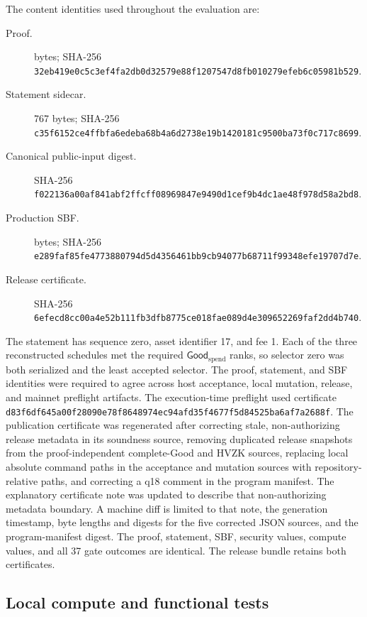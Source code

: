 The content identities used throughout the evaluation are:
\begin{description}
  \item[Proof.] \ProfileProofBytes{} bytes; SHA-256
  \nolinkurl{32eb419e0c5c3ef4fa2db0d32579e88f1207547d8fb010279efeb6c05981b529}.
  \item[Statement sidecar.] 767 bytes; SHA-256
  \nolinkurl{c35f6152ce4ffbfa6edeba68b4a6d2738e19b1420181c9500ba73f0c717c8699}.
  \item[Canonical public-input digest.] SHA-256
  \nolinkurl{f022136a00af841abf2ffcff08969847e9490d1cef9b4dc1ae48f978d58a2bd8}.
  \item[Production SBF.] \ProfileSbfBytes{} bytes; SHA-256
  \nolinkurl{e289faf85fe4773880794d5d4356461bb9cb94077b68711f99348efe19707d7e}.
  \item[Release certificate.] SHA-256
  \nolinkurl{6efecd8cc00a4e52b111fb3dfb8775ce018fae089d4e309652269faf2dd4b740}.
\end{description}

The statement has sequence zero, asset identifier 17, and fee 1.  Each of the
three reconstructed schedules met the required $\mathsf{Good}_{\mathrm{spend}}$ ranks,
so selector zero was both serialized and the least accepted selector.  The
proof, statement, and SBF identities were required to agree across host
acceptance, local mutation, release, and mainnet preflight artifacts.
The execution-time preflight used certificate
\nolinkurl{d83f6df645a00f28090e78f8648974ec94afd35f4677f5d84525ba6af7a2688f}.
The publication certificate was regenerated after correcting stale,
non-authorizing release metadata in its soundness source, removing duplicated
release snapshots from the proof-independent complete-Good and HVZK sources,
replacing local absolute command paths in the acceptance and mutation sources
with repository-relative paths, and correcting a q18 comment in the program
manifest.  The explanatory certificate note was updated to describe that
non-authorizing metadata boundary.  A machine diff is limited to that note,
the generation timestamp, byte lengths and digests for the five corrected
JSON sources, and the program-manifest digest.  The proof, statement, SBF,
security values, compute values, and all 37 gate outcomes are identical.  The
release bundle retains both certificates.

\subsection{Local compute and functional tests}
\label{sec:evaluation-local}

